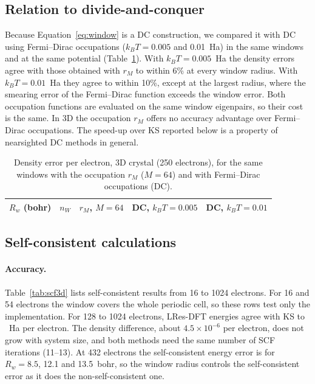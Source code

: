 \documentclass[aps,prb,twocolumn,superscriptaddress,floatfix,longbibliography]{revtex4-2}
\theoremstyle{remark}
\begin{document}
\subsection{Relation to divide-and-conquer}\label{sec:dc}

Because Equation~\eqref{eq:window} is a DC construction, we compared it with DC using Fermi--Dirac occupations
($k_BT=0.005$ and 0.01~Ha) in the same windows and at the same potential (Table~\ref{tab:dc}). With $k_BT=0.005$~Ha the
density errors agree with those obtained with $r_M$ to within 6\% at every window radius. With $k_BT=0.01$~Ha they agree to
within 10\%, except at the largest radius, where the smearing error of the Fermi--Dirac function exceeds the window error.
Both occupation functions are evaluated on the same window eigenpairs, so their cost is the same. In 3D the occupation
$r_M$ offers no accuracy advantage over Fermi--Dirac occupations. The speed-up over KS reported below is a property of
nearsighted DC methods in general.

\begin{table}[t]
\caption{\label{tab:dc}Density error per electron, 3D crystal (250 electrons), for the same windows with the occupation
$r_M$ ($M=64$) and with Fermi--Dirac occupations (DC).}
\begin{ruledtabular}
\footnotesize
\begin{tabular}{ccccc}
$R_w$ (bohr) & $n_W$ & $r_M$, $M=64$ & DC, $k_BT=0.005$ & DC, $k_BT=0.01$ \\
\hline

\end{tabular}
\end{ruledtabular}
\end{table}

\subsection{Self-consistent calculations}

\paragraph*{Accuracy.} Table~\ref{tab:scf3d} lists self-consistent results from 16 to 1024 electrons. For 16 and 54
electrons the window covers the whole periodic cell, so these rows test only the implementation. For 128 to 1024 electrons,
LRes-DFT energies agree with KS to ~Ha per electron. The density difference, about
$4.5\times10^{-6}$ per electron, does not grow with system size, and both methods need the same number of SCF iterations
(11--13). At 432 electrons the self-consistent energy error is  for $R_w=8.5$, 12.1 and
13.5~bohr, so the window radius controls the self-consistent error as it does the non-self-consistent one.
\end{document}
